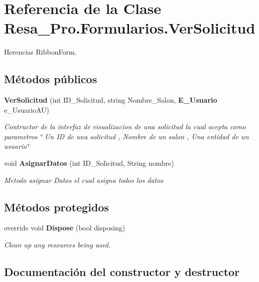 \section{Referencia de la Clase Resa\+\_\+\+Pro.\+Formularios.\+Ver\+Solicitud}
\label{class_resa___pro_1_1_formularios_1_1_ver_solicitud}


Herencias Ribbon\+Form.

\subsection*{Métodos públicos}
\begin{DoxyCompactItemize}
\item 
{\bf Ver\+Solicitud} (int I\+D\+\_\+\+Solicitud, string Nombre\+\_\+\+Salon, {\bf E\+\_\+\+Usuario} e\+\_\+\+Usuario\+AU)
\begin{DoxyCompactList}\small\item\em Contructor de la interfaz de visualizacion de una solicitud la cual acepta como parametros \char`\"{} Un I\+D de una solicitud , Nombre de un salon , Una entidad de un usuario\char`\"{} \end{DoxyCompactList}\item 
void {\bf Asignar\+Datos} (int I\+D\+\_\+\+Solicitud, String nombre)
\begin{DoxyCompactList}\small\item\em Metodo asignar Datos el cual asigna todos los datos \end{DoxyCompactList}\end{DoxyCompactItemize}
\subsection*{Métodos protegidos}
\begin{DoxyCompactItemize}
\item 
override void {\bf Dispose} (bool disposing)
\begin{DoxyCompactList}\small\item\em Clean up any resources being used. \end{DoxyCompactList}\end{DoxyCompactItemize}


\subsection{Documentación del constructor y destructor}
